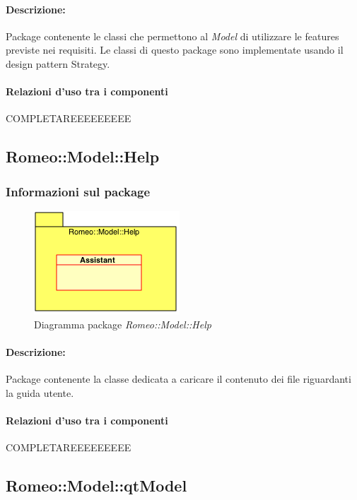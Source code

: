 			\paragraph{Descrizione:}Package\g{} contenente le classi che permettono al \textsl{Model} di utilizzare le features\g{} previste nei requisiti. Le classi di questo package\g{} sono implementate usando il design pattern\g{} Strategy.
			\paragraph{Relazioni d'uso tra i componenti}
COMPLETAREEEEEEEEE	\subsection{Romeo::Model::Help}
		\subsubsection{Informazioni sul package}
			\begin{figure}[!h]
				\centering
				\includegraphics[scale=0.5]{./Content/Immagini/Help.png}
				\caption{Diagramma package \textsl{Romeo::Model::Help}}
			\end{figure}
			\paragraph{Descrizione:}Package\g{} contenente la classe dedicata a caricare il contenuto dei file riguardanti la guida utente.
			\paragraph{Relazioni d'uso tra i componenti}
COMPLETAREEEEEEEEE	\subsection{Romeo::Model::qtModel}
